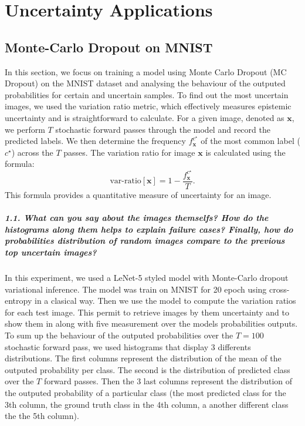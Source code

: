 \graphicspath{{figs/3c}}

\chapter{Uncertainty Applications}


\section{Monte-Carlo Dropout on MNIST}
In this section, we focus on training a model using Monte Carlo Dropout (MC Dropout) on the MNIST dataset and analysing the behaviour of the outputed probabilities for certain and uncertain samples. To find out the most uncertain images, we used the variation ratio metric, which effectively measures epistemic uncertainty and is straightforward to calculate. For a given image, denoted as $ \mathbf{x} $, we perform $ T $ stochastic forward passes through the model and record the predicted labels. We then determine the frequency $ f^{c^\star }_\mathbf{x} $ of the most common label ($ c^\star $) across the $ T $ passes. The variation ratio for image $ \mathbf{x} $ is calculated using the formula:
\[
    \text{var-ratio}[\mathbf{x}] = 1 - \frac{f^{c^\star }_\mathbf{x}}{T}
.\]
This formula provides a quantitative measure of uncertainty for an image.


\paragraph*{1.1. What can you say about the images themselfs? How do the histograms along them helps to explain failure cases? Finally, how do probabilities distribution of random images compare to the previous top uncertain images?}

In this experiment, we used a LeNet-5 styled model with Monte-Carlo dropout variational inference. The model was train on MNIST for 20 epoch using cross-entropy in a clasical way. Then we use the model to compute the variation ratios for each test image. This permit to retrieve images by them uncertainty and to show them in  along with five measurement over the models probabilities outputs. To sum up the behaviour of the outputed probabilities over the $ T=100 $ stochastic forward pass, we used histograms that display 3 differents distributions.
The first columns represent the distribution of the mean of the outputed probability per class.
The second is the distribution of predicted class over the $ T $ forward passes.
Then the 3 last columns represent the distribution of the outputed probability of a particular class (the most predicted class for the 3th column, the ground truth class in the 4th column, a another different class the the 5th column).

